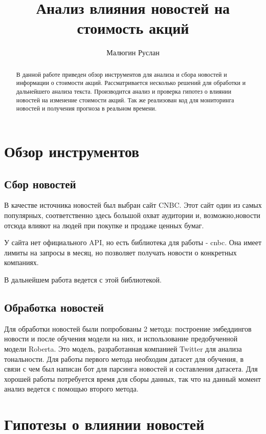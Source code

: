 \documentclass{article}
\title{Анализ влияния новостей на стоимость акций}
\author{Малюгин Руслан}
\begin{document}
\maketitle

\renewcommand{\abstractname}{Аннотация}

\begin{abstract}
В данной работе приведен обзор инструментов для анализа и сбора новостей и информации о стоимости акций. Рассматривается несколько решений для обработки и дальнейшего анализа текста. Производится анализ и проверка гипотез о влиянии новостей на изменение стоимости акций. Так же реализован код для мониторинга новостей и получения прогноза в реальном времени.
\end{abstract}

\section{Обзор инструментов}

\subsection{Сбор новостей}
В качестве источника новостей был выбран сайт CNBC. Этот сайт один из самых популярных, соответственно здесь большой охват аудитории и, возможно,новости отсюда влияют на людей при покупке и продаже ценных бумаг.

У сайта нет официального API, но есть библиотека для работы - cnbc. Она имеет лимиты на запросы в месяц, но позволяет получать новости о конкретных компаниях.

В дальнейшем работа ведется с этой библиотекой.

\subsection{Обработка новостей}

Для обработки новостей были попробованы 2 метода: построение эмбеддингов новости и после обучения модели на них, и использование предобученной модели Roberta. Это модель, разработанная компанией Twitter для анализа тональности. Для работы первого метода необходим датасет для обучения, в связи с чем был написан бот для парсинга новостей и составления датасета. Для хорошей работы потребуется время для сборы данных, так что на данный момент анализ ведется с помощью второго метода.

\section{Гипотезы о влиянии новостей}
\end{document}
